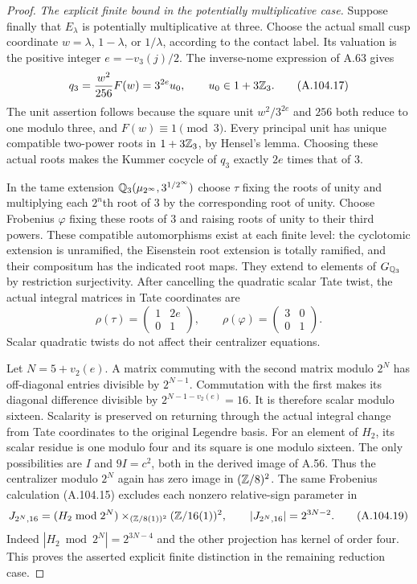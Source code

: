 \begin{proof}
\emph{The explicit finite bound in the potentially multiplicative case.}
Suppose finally that $E_\lambda$ is
potentially multiplicative at three.
Choose the actual small cusp coordinate
$w=\lambda$, $1-\lambda$, or $1/\lambda$,
according to the contact label.
Its valuation is the positive integer
$e=-v_3(j)/2$.
The inverse-nome expression of A.63 gives
\[
         q_3=\frac{w^2}{256}F(w)
                 =3^{2e}u_0,
                       \qquad u_0\in1+3\mathbb Z_3.
\tag{A.104.17}
\]
The unit assertion follows because the
square unit $w^2/3^{2e}$ and $256$ both
reduce to one modulo three, and
$F(w)\equiv1\pmod3$.
Every principal unit has unique compatible
two-power roots in $1+3\mathbb Z_3$, by Hensel's
lemma.  Choosing these actual roots makes
the Kummer cocycle of $q_3$ exactly
$2e$ times that of $3$.

In the tame extension
$\mathbb Q_3(\mu_{2^\infty},3^{1/2^\infty})$
choose $\tau$ fixing the roots of unity
and multiplying each $2^n$th root of
$3$ by the corresponding root of unity.
Choose Frobenius $\varphi$ fixing these
roots of $3$ and raising roots of unity
to their third powers.
These compatible automorphisms exist
at each finite level: the cyclotomic
extension is unramified, the Eisenstein
root extension is totally ramified,
and their compositum has the indicated
root maps.  They extend to elements
of $G_{\mathbb Q_3}$ by restriction surjectivity.
After cancelling the quadratic scalar
Tate twist, the actual integral matrices
in Tate coordinates are
\[
          \rho(\tau)=\begin{pmatrix}1&2e\\0&1\end{pmatrix},
          \qquad
          \rho(\varphi)=\begin{pmatrix}3&0\\0&1\end{pmatrix}.
\tag{A.104.18}
\]
Scalar quadratic twists do not affect
their centralizer equations.

Let $N=5+v_2(e)$.
A matrix commuting with the second
matrix modulo $2^N$ has off-diagonal
entries divisible by $2^{N-1}$.
Commutation with the first makes its
diagonal difference divisible by
$2^{N-1-v_2(e)}=16$.
It is therefore scalar modulo sixteen.
Scalarity is preserved on returning
through the actual integral change
from Tate coordinates to the original
Legendre basis.
For an element of $H_2$, its scalar
residue is one modulo four and its
square is one modulo sixteen.
The only possibilities are $I$ and
$9I=c^2$, both in the derived image
of A.56.  Thus the centralizer modulo
$2^N$ again has zero image in
$(\mathbb Z/8)^2$.
The same Frobenius calculation
(A.104.15) excludes each nonzero
relative-sign parameter in
\[
       J_{2^N,16}
        =(H_2\bmod2^N)
              \mathbin{\times}_{(\mathbb Z/8(1))^2}
                               (\mathbb Z/16(1))^2,
          \qquad |J_{2^N,16}|=2^{3N-2}.
\tag{A.104.19}
\]
Indeed $|H_2\bmod2^N|=2^{3N-4}$
and the other projection has kernel
of order four.
This proves the asserted explicit
finite distinction in the remaining
reduction case.
\end{proof}

